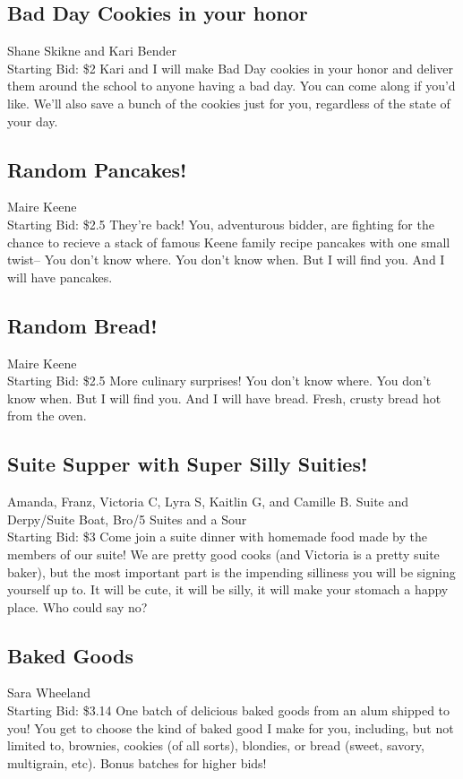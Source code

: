 \documentclass[11pt]{article}
\begin{document}
\subsection{Bad Day Cookies in your honor}
Shane Skikne and Kari Bender
\\
Starting Bid: \$2
\newline
Kari and I will make Bad Day cookies in your honor and deliver them around the school to anyone having a bad day. You can come along if you'd like. We'll also save a bunch of the cookies just for you, regardless of the state of your day.
\subsection{Random Pancakes!}
Maire Keene
\\
Starting Bid: \$2.5
\newline
They're back! 
You, adventurous bidder, are fighting for the chance to recieve a stack of  famous Keene family recipe pancakes with one small twist--
You don't know where. 
You don't know when. 
But I will find you. 
And I will have pancakes.
\subsection{Random Bread!}
Maire Keene
\\
Starting Bid: \$2.5
\newline
More culinary surprises!
You don't know where.
You don't know when.
But I will find you.
And I will have bread.
Fresh, crusty bread hot from the oven.
\subsection{Suite Supper with Super Silly Suities!}
Amanda, Franz, Victoria C, Lyra S, Kaitlin G, and Camille B. Suite and Derpy/Suite Boat, Bro/5 Suites and a Sour
\\
Starting Bid: \$3
\newline
Come join a suite dinner with homemade food made by the members of our suite! We are pretty good cooks (and Victoria is a pretty suite baker), but the most important part is the impending silliness you will be signing yourself up to. It will be cute, it will be silly, it will make your stomach a happy place. Who could say no?
\subsection{Baked Goods}
Sara Wheeland
\\
Starting Bid: \$3.14
\newline
One batch of delicious baked goods from an alum shipped to you!  You get to choose the kind of baked good I make for you, including, but not limited to, brownies, cookies (of all sorts), blondies, or bread (sweet, savory, multigrain, etc).  Bonus batches for higher bids!
\end{document}
